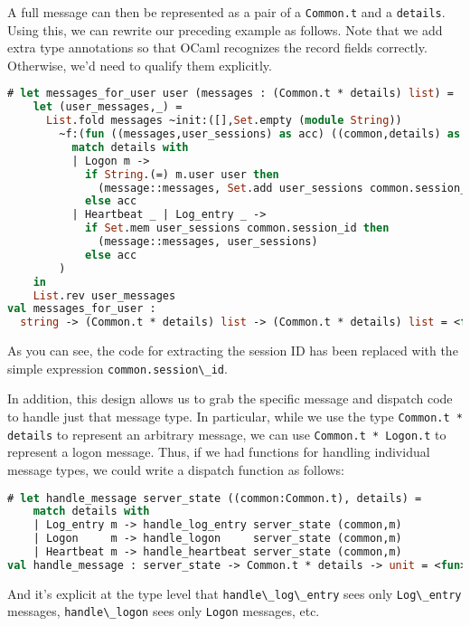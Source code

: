 A full message can then be represented as a pair of a
\passthrough{\lstinline!Common.t!} and a
\passthrough{\lstinline!details!}. Using this, we can rewrite our
preceding example as follows. Note that we add extra type annotations so
that OCaml recognizes the record fields correctly. Otherwise, we'd need
to qualify them explicitly.

\begin{lstlisting}[language=Caml]
# let messages_for_user user (messages : (Common.t * details) list) =
    let (user_messages,_) =
      List.fold messages ~init:([],Set.empty (module String))
        ~f:(fun ((messages,user_sessions) as acc) ((common,details) as message) ->
          match details with
          | Logon m ->
            if String.(=) m.user user then
              (message::messages, Set.add user_sessions common.session_id)
            else acc
          | Heartbeat _ | Log_entry _ ->
            if Set.mem user_sessions common.session_id then
              (message::messages, user_sessions)
            else acc
        )
    in
    List.rev user_messages
val messages_for_user :
  string -> (Common.t * details) list -> (Common.t * details) list = <fun>
\end{lstlisting}

As you can see, the code for extracting the session ID has been replaced
with the simple expression \passthrough{\lstinline!common.session\_id!}.

In addition, this design allows us to grab the specific message and
dispatch code to handle just that message type. In particular, while we
use the type \passthrough{\lstinline!Common.t * details!} to represent
an arbitrary message, we can use
\passthrough{\lstinline!Common.t * Logon.t!} to represent a logon
message. Thus, if we had functions for handling individual message
types, we could write a dispatch function as follows:

\begin{lstlisting}[language=Caml]
# let handle_message server_state ((common:Common.t), details) =
    match details with
    | Log_entry m -> handle_log_entry server_state (common,m)
    | Logon     m -> handle_logon     server_state (common,m)
    | Heartbeat m -> handle_heartbeat server_state (common,m)
val handle_message : server_state -> Common.t * details -> unit = <fun>
\end{lstlisting}

And it's explicit at the type level that
\passthrough{\lstinline!handle\_log\_entry!} sees only
\passthrough{\lstinline!Log\_entry!} messages,
\passthrough{\lstinline!handle\_logon!} sees only
\passthrough{\lstinline!Logon!} messages, etc. ~~


